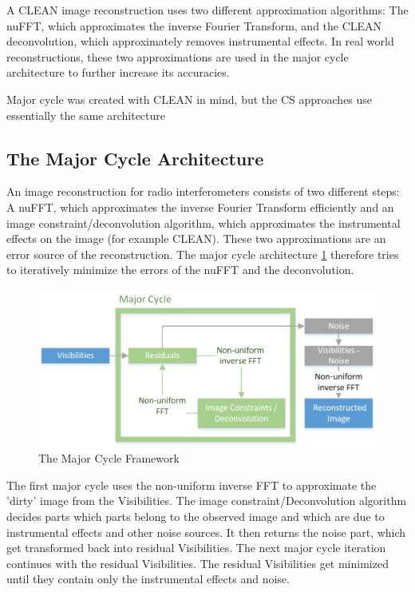 A CLEAN image reconstruction uses two different approximation algorithms: The nuFFT, which approximates the inverse Fourier Transform, and the CLEAN deconvolution, which approximately removes instrumental effects. In real world reconstructions, these two approximations are used in the major cycle architecture to further increase its accuracies.

Major cycle was created with CLEAN in mind, but the CS approaches use essentially the same architecture


\subsection{The Major Cycle Architecture}
An image reconstruction for radio interferometers consists of two different steps: A nuFFT, which approximates the inverse Fourier Transform efficiently and an image constraint/deconvolution algorithm, which approximates the instrumental effects on the image (for example CLEAN). These two approximations are an error source of the reconstruction. The major cycle architecture \ref{intro:major} therefore tries to iteratively minimize the errors of the nuFFT and the deconvolution.

\begin{figure}
	\centering
	\vspace{-10pt}
	\includegraphics[width=1.0\linewidth]{./chapters/01.intro/Major-Minor.png}
	\caption{The Major Cycle Framework}
	\label{intro:major}
	\vspace{-10pt}
\end{figure}

The first major cycle uses the non-uniform inverse FFT to approximate the 'dirty' image from the Visibilities. The image constraint/Deconvolution algorithm decides parts which parts belong to the observed image and which are due to instrumental effects and other noise sources. It then returns the noise part, which get transformed back into residual Visibilities. The next major cycle iteration continues with the residual Visibilities. The residual Visibilities get minimized until they contain only the instrumental effects and noise.

